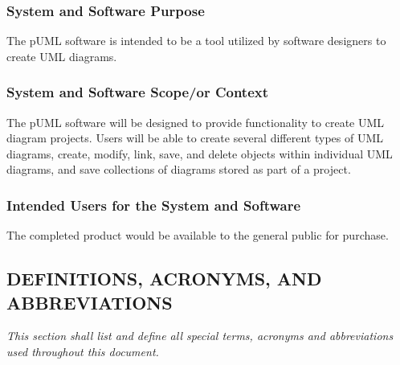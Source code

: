 \documentclass[twoside,letterpaper]{article}
\begin{document}
{\subsubsection{System and Software Purpose}
{\color{black}
The pUML software is intended to be a tool utilized by software designers to create UML diagrams.
}

\subsubsection[System and Software Scope/or Context]{System and Software
Scope/or Context}
{\color{black}
The pUML software will be designed to provide functionality to create UML diagram projects.  Users will be able to create several different types of UML diagrams, create, modify, link, save, and delete objects within individual UML diagrams, and save collections of diagrams stored as part of a project.
}

\subsubsection{Intended Users for the System and Software}
{\color{black}
The completed product would be available to the general public for purchase.
}


\clearpage
\subsection[DEFINITIONS, ACRONYMS, AND
ABBREVIATIONS]{\bfseries\color{black}
DEFINITIONS, ACRONYMS, AND ABBREVIATIONS}
{\itshape\color{black}
This section shall list and define all special terms, acronyms and
abbreviations used throughout this document.}


}
\end{document}
